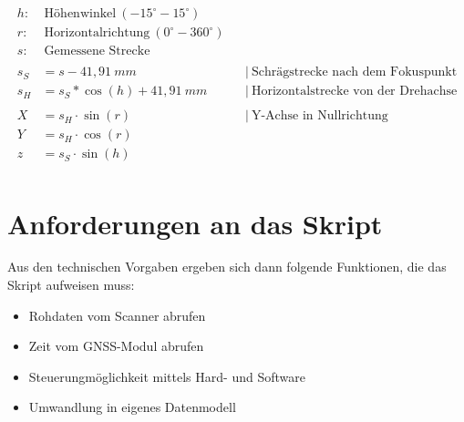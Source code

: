 \documentclass[a4paper,12pt,bibliography=totoc, listof=totoc,titlepage,pointlessnumbers]{scrreprt}
\begin{document}
\begin{equation}
\begin{aligned}
h:&~\text{H\"{o}henwinkel}~(-15^\circ - 15^\circ) \\
r:&~\text{Horizontalrichtung}~(0^\circ - 360^\circ) \\
s:&~\text{Gemessene~Strecke} \\
\\
s_S &= s - 41,91~mm    		 && \left|\  \text{Schr\"{a}gstrecke nach dem Fokuspunkt} \right. \\
s_H &= s_S * \cos(h) + 41,91~mm  && \left|\  \text{Horizontalstrecke von der Drehachse} \right. \\
\\
X &= s_H \cdot \sin(r) && \left|\  \text{Y-Achse in Nullrichtung} \right. \\
Y &= s_H \cdot \cos(r) \\
z &= s_S \cdot \sin(h) \\
\end{aligned}
\label{equ:koordinaten}
\end{equation}

\section{Anforderungen an das Skript}
\label{s:anforderungen}
Aus den technischen Vorgaben ergeben sich dann folgende Funktionen, die das Skript aufweisen muss:
\begin{itemize}
 \item Rohdaten vom Scanner abrufen
 \item Zeit vom GNSS-Modul abrufen
 \item Steuerungmöglichkeit mittels Hard- und Software
 \item Umwandlung in eigenes Datenmodell
\end{itemize}
\end{document}
